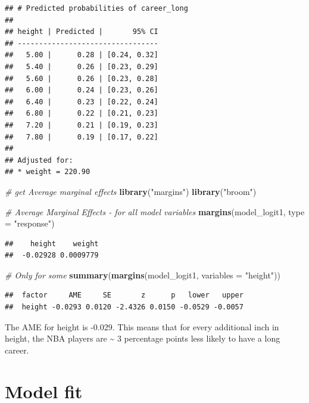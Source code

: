 \documentclass[
]{book}
\newenvironment{Shaded}{\begin{snugshade}}{\end{snugshade}}
\newcommand{\AttributeTok}[1]{\textcolor[rgb]{0.13,0.29,0.53}{#1}}
\newcommand{\CommentTok}[1]{\textcolor[rgb]{0.56,0.35,0.01}{\textit{#1}}}
\newcommand{\FunctionTok}[1]{\textcolor[rgb]{0.13,0.29,0.53}{\textbf{#1}}}
\newcommand{\NormalTok}[1]{#1}
\newcommand{\StringTok}[1]{\textcolor[rgb]{0.31,0.60,0.02}{#1}}
\begin{document}
\begin{verbatim}
## # Predicted probabilities of career_long
## 
## height | Predicted |       95% CI
## ---------------------------------
##   5.00 |      0.28 | [0.24, 0.32]
##   5.40 |      0.26 | [0.23, 0.29]
##   5.60 |      0.26 | [0.23, 0.28]
##   6.00 |      0.24 | [0.23, 0.26]
##   6.40 |      0.23 | [0.22, 0.24]
##   6.80 |      0.22 | [0.21, 0.23]
##   7.20 |      0.21 | [0.19, 0.23]
##   7.80 |      0.19 | [0.17, 0.22]
## 
## Adjusted for:
## * weight = 220.90
\end{verbatim}

\begin{Shaded}
\begin{Highlighting}[]
\CommentTok{\# get Average marginal effects}
\FunctionTok{library}\NormalTok{(}\StringTok{"margins"}\NormalTok{)}
\FunctionTok{library}\NormalTok{(}\StringTok{"broom"}\NormalTok{)}

\CommentTok{\# Average Marginal Effects {-} for all model variables}
\FunctionTok{margins}\NormalTok{(model\_logit1, }\AttributeTok{type =} \StringTok{"response"}\NormalTok{)}
\end{Highlighting}
\end{Shaded}

\begin{verbatim}
##    height    weight
##  -0.02928 0.0009779
\end{verbatim}

\begin{Shaded}
\begin{Highlighting}[]
\CommentTok{\# Only for some}
\FunctionTok{summary}\NormalTok{(}\FunctionTok{margins}\NormalTok{(model\_logit1, }\AttributeTok{variables =} \StringTok{"height"}\NormalTok{))}
\end{Highlighting}
\end{Shaded}

\begin{verbatim}
##  factor     AME     SE       z      p   lower   upper
##  height -0.0293 0.0120 -2.4326 0.0150 -0.0529 -0.0057
\end{verbatim}

The AME for height is -0.029. This means that for every additional inch in height,
the NBA players are \textasciitilde{} 3 percentage points less likely to have a long career.

\hypertarget{model-fit-1}{%
\section{Model fit}\label{model-fit-1}}
\end{document}
